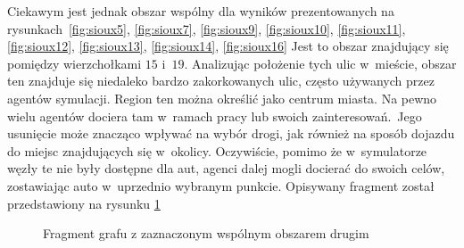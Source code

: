 \documentclass[twoside,12pt]{report}
\begin{document}
Ciekawym jest jednak obszar wspólny dla wyników prezentowanych na rysunkach~\ref{fig:sioux5}, \ref{fig:sioux7}, \ref{fig:sioux9}, \ref{fig:sioux10}, \ref{fig:sioux11}, \ref{fig:sioux12}, \ref{fig:sioux13}, \ref{fig:sioux14}, \ref{fig:sioux16} Jest to obszar znajdujący się pomiędzy wierzchołkami $15$ i~$19$. Analizując położenie tych ulic w~mieście, obszar ten znajduje się niedaleko bardzo zakorkowanych ulic, często używanych przez agentów symulacji. Region ten można określić jako centrum miasta. Na pewno wielu agentów dociera tam w~ramach pracy lub swoich zainteresowań.~Jego usunięcie może znacząco wpływać na wybór drogi, jak również na sposób dojazdu do miejsc znajdujących się w~okolicy. Oczywiście, pomimo że w~symulatorze węzły te nie były dostępne dla aut, agenci dalej mogli docierać do swoich celów, zostawiając auto w~uprzednio wybranym punkcie. Opisywany fragment został przedstawiony na rysunku \ref{fig:frag_2}

\begin{figure}[htbp]
\centering
{}
\caption{Fragment grafu z zaznaczonym wspólnym obszarem drugim}
\label{fig:frag_2}
\end{figure}
\end{document}
